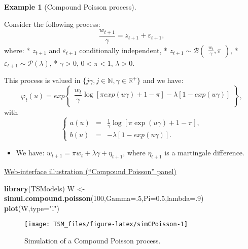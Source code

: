 \documentclass[
  12pt,
]{book}
\newenvironment{Shaded}{\begin{snugshade}}{\end{snugshade}}
\newcommand{\AttributeTok}[1]{\textcolor[rgb]{0.13,0.29,0.53}{#1}}
\newcommand{\DecValTok}[1]{\textcolor[rgb]{0.00,0.00,0.81}{#1}}
\newcommand{\FloatTok}[1]{\textcolor[rgb]{0.00,0.00,0.81}{#1}}
\newcommand{\FunctionTok}[1]{\textcolor[rgb]{0.13,0.29,0.53}{\textbf{#1}}}
\newcommand{\NormalTok}[1]{#1}
\newcommand{\OtherTok}[1]{\textcolor[rgb]{0.56,0.35,0.01}{#1}}
\newcommand{\StringTok}[1]{\textcolor[rgb]{0.31,0.60,0.02}{#1}}
\providecommand{\tightlist}{%
  \setlength{\itemsep}{0pt}\setlength{\parskip}{0pt}}
\theoremstyle{definition}
\theoremstyle{definition}
\newtheorem{example}{Example}[chapter]
\theoremstyle{definition}
\theoremstyle{definition}
\theoremstyle{remark}
\begin{document}
\begin{example}[Compound Poisson process]
\protect\hypertarget{exm:CompoundPoisson}{}\label{exm:CompoundPoisson}

Consider the following process:
\[\frac{w_{t+1}}{\gamma} = z_{t+1} + \varepsilon_{t+1},
\]
where:
* \(z_{t+1}\) and \(\varepsilon_{t+1}\) conditionally independent,
* \(z_{t+1} \sim {\mathcal B} \left( \begin{array}{l}  \frac{w_t}{\gamma}, \pi \end{array} \right)\),
* \(\varepsilon_{t+1} \sim {\mathcal P}(\lambda)\),
* \(\gamma > 0\), \(0 < \pi< 1\), \(\lambda > 0\).

This process is valued in \(\{j \gamma, j \in \mathbb{N}, \gamma \in \mathbb{R}^+\}\) and we have:
\[
\varphi_t(u) = exp\left\{
\begin{array}{l}
 \dfrac{w_t}{\gamma}   \log[\pi  
exp(u\gamma)+1-\pi]-\lambda[1-exp(u \gamma)]
\end{array}
\right\},
\]
with
\[
\left\{
\begin{array}{ccl}
a(u)&=& \frac{1}{\gamma}   \log[\pi   \exp(u
\gamma)+1-\pi],\\
b(u) &=& -\lambda[1-exp(u \gamma)].
\end{array}
\right.
\]

\begin{itemize}
\tightlist
\item
  We have: \(w_{t+1} = \pi w_t + \lambda \gamma + \eta_{t+1}\), where \(\eta_{t+1}\) is a
  martingale difference.
\end{itemize}

\href{https://jrenne.shinyapps.io/Affine/}{Web-interface illustration (``Compound Poisson'' panel)}

\begin{Shaded}
\begin{Highlighting}[]
\FunctionTok{library}\NormalTok{(TSModels)}
\NormalTok{W }\OtherTok{\textless{}{-}} \FunctionTok{simul.compound.poisson}\NormalTok{(}\DecValTok{100}\NormalTok{,}\AttributeTok{Gamma=}\NormalTok{.}\DecValTok{5}\NormalTok{,}\AttributeTok{Pi=}\FloatTok{0.5}\NormalTok{,}\AttributeTok{lambda=}\NormalTok{.}\DecValTok{9}\NormalTok{)}
\FunctionTok{plot}\NormalTok{(W,}\AttributeTok{type=}\StringTok{"l"}\NormalTok{)}
\end{Highlighting}
\end{Shaded}

\begin{figure}
\texttt{[image: TSM\_files/figure-latex/simCPoisson-1]} \caption{Simulation of a Compound Poisson  process.}\label{fig:simCPoisson}
\end{figure}

\end{example}
\end{document}
